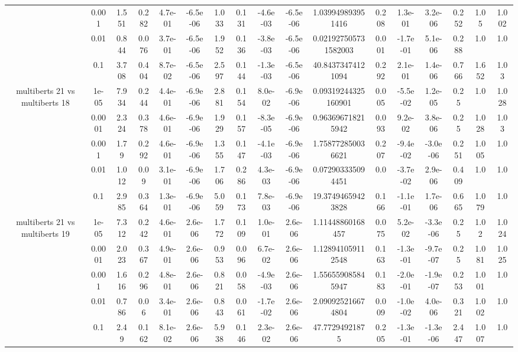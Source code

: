 \begin{tabular}{|c|c|c|c|c|c|c|c|c|c|c|c|c|c|c|c|c|}
 & 0.001 & 1.551 & 0.282 & 4.7e-01 & -6.5e-06 & 1.033 & 0.131 & -4.6e-03 & -6.5e-06 & 1.039949893951416 & 0.208 & 1.3e-01 & 3.2e-06 & 0.252 & 1.05 & 1.002 \\
 & 0.01 & 0.844 & 0.076 & 3.7e-01 & -6.5e-06 & 1.952 & 0.136 & -3.8e-03 & -6.5e-06 & 0.021927505731582003 & 0.001 & -1.7e-01 & 5.1e-06 & 0.288 & 1.0 & 1.0 \\
 & 0.1 & 3.708 & 0.404 & 8.7e-02 & -6.5e-06 & 2.597 & 0.144 & -1.3e-03 & -6.5e-06 & 40.84373474121094 & 0.292 & 2.1e-01 & 1.4e-06 & 0.766 & 1.652 & 1.03 \\
\hline
\multirow{5}{*}{multiberts 21 vs multiberts 18} & 1e-05 & 7.934 & 0.244 & 4.4e-01 & -6.9e-06 & 2.881 & 0.154 & 8.0e-02 & -6.9e-06 & 0.09319244325160901 & 0.005 & -5.5e-02 & 1.2e-05 & 0.25 & 1.0 & 1.028 \\
 & 0.0001 & 2.324 & 0.378 & 4.6e-01 & -6.9e-06 & 1.929 & 0.157 & -8.3e-05 & -6.9e-06 & 0.963696718215942 & 0.093 & 9.2e-02 & 3.8e-06 & 0.25 & 1.028 & 1.03 \\
 & 0.001 & 1.79 & 0.292 & 4.6e-01 & -6.9e-06 & 1.355 & 0.147 & -4.1e-03 & -6.9e-06 & 1.758772850036621 & 0.207 & -9.4e-02 & -3.0e-06 & 0.251 & 1.005 & 1.0 \\
 & 0.01 & 1.012 & 0.09 & 3.1e-01 & -6.9e-06 & 1.706 & 0.286 & 4.3e-03 & -6.9e-06 & 0.072903335094451 & 0.0 & -3.7e-02 & 2.9e-06 & 0.409 & 1.0 & 1.0 \\
 & 0.1 & 2.985 & 0.364 & 1.3e-01 & -6.9e-06 & 5.059 & 0.173 & 7.8e-03 & -6.9e-06 & 19.37494659423828 & 0.166 & -1.1e-01 & 1.7e-06 & 0.665 & 1.079 & 1.0 \\
\hline
\multirow{5}{*}{multiberts 21 vs multiberts 19} & 1e-05 & 7.312 & 0.242 & 4.6e-01 & 2.6e-06 & 1.772 & 0.109 & 1.0e-01 & 2.6e-06 & 1.11448860168457 & 0.075 & 5.2e-02 & -3.3e-06 & 0.25 & 1.02 & 1.024 \\
 & 0.0001 & 2.023 & 0.367 & 4.9e-01 & 2.6e-06 & 0.953 & 0.096 & 6.7e-02 & 2.6e-06 & 1.128941059112548 & 0.163 & -1.3e-01 & -9.7e-07 & 0.25 & 1.081 & 1.025 \\
 & 0.001 & 1.616 & 0.296 & 4.8e-01 & 2.6e-06 & 0.821 & 0.058 & -4.9e-03 & 2.6e-06 & 1.556559085845947 & 0.183 & -2.0e-01 & -1.9e-07 & 0.253 & 1.001 & 1.0 \\
 & 0.01 & 0.786 & 0.06 & 3.4e-01 & 2.6e-06 & 0.843 & 0.061 & -1.7e-02 & 2.6e-06 & 2.090925216674804 & 0.009 & -1.0e-02 & 4.0e-06 & 0.321 & 1.002 & 1.0 \\
 & 0.1 & 2.49 & 0.162 & 8.1e-02 & 2.6e-06 & 5.938 & 0.146 & 2.3e-02 & 2.6e-06 & 47.77294921875 & 0.205 & -1.3e-01 & -1.3e-06 & 2.447 & 1.007 & 1.0 \\

\end{tabular}
